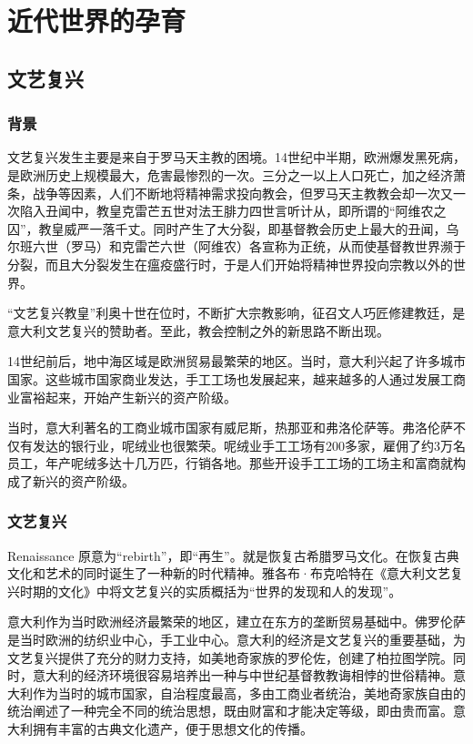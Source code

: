 \section{近代世界的孕育}

\subsection{文艺复兴}
\subsubsection{背景}
文艺复兴发生主要是来自于罗马天主教的困境。14世纪中半期，欧洲爆发黑死病，是欧洲历史上规模最大，危害最惨烈的一次。三分之一以上人口死亡，加之经济萧条，战争等因素，人们不断地将精神需求投向教会，但罗马天主教教会却一次又一次陷入丑闻中，教皇克雷芒五世对法王腓力四世言听计从，即所谓的“阿维农之囚”，教皇威严一落千丈。同时产生了大分裂，即基督教会历史上最大的丑闻，乌尔班六世（罗马）和克雷芒六世（阿维农）各宣称为正统，从而使基督教世界濒于分裂，而且大分裂发生在瘟疫盛行时，于是人们开始将精神世界投向宗教以外的世界。

“文艺复兴教皇”利奥十世在位时，不断扩大宗教影响，征召文人巧匠修建教廷，是意大利文艺复兴的赞助者。至此，教会控制之外的新思路不断出现。

14世纪前后，地中海区域是欧洲贸易最繁荣的地区。当时，意大利兴起了许多城市国家。这些城市国家商业发达，手工工场也发展起来，越来越多的人通过发展工商业富裕起来，开始产生新兴的资产阶级。

当时，意大利著名的工商业城市国家有威尼斯，热那亚和弗洛伦萨等。弗洛伦萨不仅有发达的银行业，呢绒业也很繁荣。呢绒业手工工场有200多家，雇佣了约3万名员工，年产呢绒多达十几万匹，行销各地。那些开设手工工场的工场主和富商就构成了新兴的资产阶级。

\subsubsection{文艺复兴}
Renaissance 原意为“rebirth”，即“再生”。就是恢复古希腊罗马文化。在恢复古典文化和艺术的同时诞生了一种新的时代精神。雅各布·布克哈特在《意大利文艺复兴时期的文化》中将文艺复兴的实质概括为“世界的发现和人的发现”。

意大利作为当时欧洲经济最繁荣的地区，建立在东方的垄断贸易基础中。佛罗伦萨是当时欧洲的纺织业中心，手工业中心。意大利的经济是文艺复兴的重要基础，为文艺复兴提供了充分的财力支持，如美地奇家族的罗伦佐，创建了柏拉图学院。同时，意大利的经济环境很容易培养出一种与中世纪基督教教诲相悖的世俗精神。意大利作为当时的城市国家，自治程度最高，多由工商业者统治，美地奇家族自由的统治阐述了一种完全不同的统治思想，既由财富和才能决定等级，即由贵而富。意大利拥有丰富的古典文化遗产，便于思想文化的传播。

